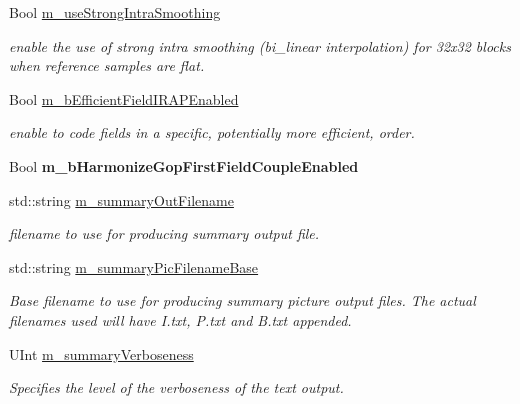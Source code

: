 \begin{DoxyCompactItemize}
\mbox{\label{class_t_enc_cfg_a201946b1cf4afd7f832e36e7e1dd7446}} 
Bool \hyperlink{class_t_enc_cfg_a201946b1cf4afd7f832e36e7e1dd7446}{m\+\_\+use\+Strong\+Intra\+Smoothing}
\begin{DoxyCompactList}\small\item\em enable the use of strong intra smoothing (bi\+\_\+linear interpolation) for 32x32 blocks when reference samples are flat. \end{DoxyCompactList}\item 
\mbox{\label{class_t_enc_cfg_a8248a56e1a3573d6a120727a9d7b123d}} 
Bool \hyperlink{class_t_enc_cfg_a8248a56e1a3573d6a120727a9d7b123d}{m\+\_\+b\+Efficient\+Field\+I\+R\+A\+P\+Enabled}
\begin{DoxyCompactList}\small\item\em enable to code fields in a specific, potentially more efficient, order. \end{DoxyCompactList}\item 
\mbox{\label{class_t_enc_cfg_aa9fb505821ca6e028d0b399b5702a2a9}} 
Bool {\bfseries m\+\_\+b\+Harmonize\+Gop\+First\+Field\+Couple\+Enabled}
\item 
\mbox{\label{class_t_enc_cfg_aac46835bb64a76be0ff0a00407ef54f5}} 
std\+::string \hyperlink{class_t_enc_cfg_aac46835bb64a76be0ff0a00407ef54f5}{m\+\_\+summary\+Out\+Filename}
\begin{DoxyCompactList}\small\item\em filename to use for producing summary output file. \end{DoxyCompactList}\item 
\mbox{\label{class_t_enc_cfg_a19364e6ca94161e8f43b9e1f6def0709}} 
std\+::string \hyperlink{class_t_enc_cfg_a19364e6ca94161e8f43b9e1f6def0709}{m\+\_\+summary\+Pic\+Filename\+Base}
\begin{DoxyCompactList}\small\item\em Base filename to use for producing summary picture output files. The actual filenames used will have I.\+txt, P.\+txt and B.\+txt appended. \end{DoxyCompactList}\item 
\mbox{\label{class_t_enc_cfg_a03d2f55c1fb484e96bb512aa24a0f756}} 
U\+Int \hyperlink{class_t_enc_cfg_a03d2f55c1fb484e96bb512aa24a0f756}{m\+\_\+summary\+Verboseness}
\begin{DoxyCompactList}\small\item\em Specifies the level of the verboseness of the text output. \end{DoxyCompactList}\end{DoxyCompactItemize}


